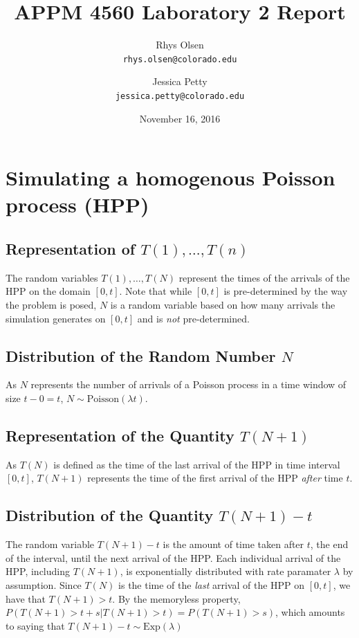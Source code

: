 \documentclass[11pt, oneside]{article}   	%
\title{APPM 4560 Laboratory 2 Report}
\author{Rhys Olsen\\
\texttt{rhys.olsen@colorado.edu}
 \and Jessica Petty\\
 \texttt{jessica.petty@colorado.edu}
 }
\date{November 16, 2016}
\begin{document}
\maketitle
\section{Simulating a homogenous Poisson process (HPP)}
\subsection{Representation of $T(1), \dots, T(n)$}
The random variables $T(1), \dots, T(N)$ represent the times of the arrivals of the HPP on the domain $[0, t]$. Note that while $[0, t]$ is pre-determined by the way the problem is posed, $N$ is a random variable based on how many arrivals the simulation generates on $[0, t]$ and is \emph{not} pre-determined.

\subsection{Distribution of the Random Number $N$}
As $N$ represents the number of arrivals of a Poisson process in a time window of size $t - 0 = t$, $N \sim \text{Poisson}(\lambda t)$.
\subsection{Representation of the Quantity $T(N+1)$}
As $T(N)$ is defined as the time of the last arrival of the HPP in time interval $[0, t]$, $T(N + 1)$ represents the time of the first arrival of the HPP \emph{after} time $t$.
\subsection{Distribution of the Quantity $T(N+1)-t$}
The random variable $T(N + 1) - t$ is the amount of time taken after $t$, the end of the interval, until the next arrival of the HPP. Each individual arrival of the HPP, including $T(N + 1)$, is exponentially distributed with rate paramater $\lambda$ by assumption. Since $T(N)$ is the time of the \emph{last} arrival of the HPP on $[0, t]$, we have that $T(N + 1) > t$. By the memoryless property, $P(T(N + 1) > t + s | T(N + 1) > t) = P(T(N + 1) > s)$, which amounts to saying that $T(N + 1) - t \sim \text{Exp}(\lambda)$
\end{document}
